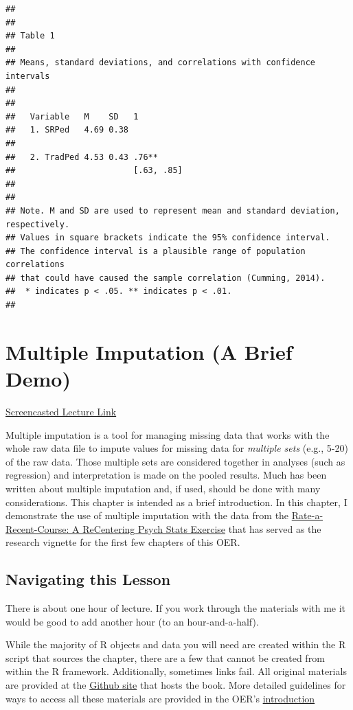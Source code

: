 \documentclass[
  11pt,
]{book}
\begin{document}
\begin{verbatim}
## 
## 
## Table 1 
## 
## Means, standard deviations, and correlations with confidence intervals
##  
## 
##   Variable   M    SD   1         
##   1. SRPed   4.69 0.38           
##                                  
##   2. TradPed 4.53 0.43 .76**     
##                        [.63, .85]
##                                  
## 
## Note. M and SD are used to represent mean and standard deviation, respectively.
## Values in square brackets indicate the 95% confidence interval.
## The confidence interval is a plausible range of population correlations 
## that could have caused the sample correlation (Cumming, 2014).
##  * indicates p < .05. ** indicates p < .01.
## 
\end{verbatim}

\hypertarget{multimp}{%
\chapter{Multiple Imputation (A Brief Demo)}\label{multimp}}

\href{https://spu.hosted.panopto.com/Panopto/Pages/Viewer.aspx?pid=94d59efe-3f02-4c65-b068-ad01003e09a9}{Screencasted Lecture Link}

Multiple imputation is a tool for managing missing data that works with the whole raw data file to impute values for missing data for \emph{multiple sets} (e.g., 5-20) of the raw data. Those multiple sets are considered together in analyses (such as regression) and interpretation is made on the pooled results. Much has been written about multiple imputation and, if used, should be done with many considerations. This chapter is intended as a brief introduction. In this chapter, I demonstrate the use of multiple imputation with the data from the \href{https://spupsych.az1.qualtrics.com/jfe/form/SV_b2cClqAlLGQ6nLU}{Rate-a-Recent-Course: A ReCentering Psych Stats Exercise} that has served as the research vignette for the first few chapters of this OER.

\hypertarget{navigating-this-lesson-3}{%
\section{Navigating this Lesson}\label{navigating-this-lesson-3}}

There is about one hour of lecture. If you work through the materials with me it would be good to add another hour (to an hour-and-a-half).

While the majority of R objects and data you will need are created within the R script that sources the chapter, there are a few that cannot be created from within the R framework. Additionally, sometimes links fail. All original materials are provided at the \href{https://github.com/lhbikos/ReC_MultivModel}{Github site} that hosts the book. More detailed guidelines for ways to access all these materials are provided in the OER's \protect\hyperlink{ReCintro}{introduction}
\end{document}
